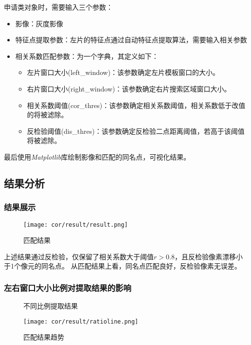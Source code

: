         申请类对象时，需要输入三个参数：
        \begin{itemize}
            \item 影像：灰度影像
            \item 特征点提取参数：左片的特征点通过自动特征点提取算法，需要输入相关参数
            \item 相关系数匹配参数：为一个字典，其定义如下：
            \begin{itemize}
                \item 左片窗口大小(left\_window)：该参数确定左片模板窗口的大小。
                \item 右片窗口大小(right\_window)：该参数确定右片搜索区域窗口大小。
                \item 相关系数阈值(cor\_thres)：该参数确定相关系数阈值，相关系数低于改值的将被滤除。
                \item 反检验阈值(dis\_thres)：该参数确定反检验二点距离阈值，若高于该阈值将被滤除。
            \end{itemize}
        \end{itemize}
        
        最后使用\textit{Matplotlib}库绘制影像和匹配的同名点，可视化结果。

\subsection{结果分析}
    \subsubsection{结果展示}
    \begin{figure}[H]
        \centering 
        \texttt{[image: cor/result/result.png]}
        \caption{匹配结果}
    \end{figure}

    上述结果通过反检验，仅保留了相关系数大于阈值$r>0.8$，且反检验像素漂移小于1个像元的同名点。
    从匹配结果上看，同名点匹配良好，反检验像素无误差。

    \subsubsection{左右窗口大小比例对提取结果的影响}
    \begin{figure}[H]
        \centering
        \caption{不同比例提取结果}
        \label{cormatch_ratio_result}
    \end{figure}
    \begin{figure}[H]
        \centering 
        \texttt{[image: cor/result/ratioline.png]}
        \caption{匹配结果趋势}
        \label{cormatch_ratioline}
    \end{figure}

